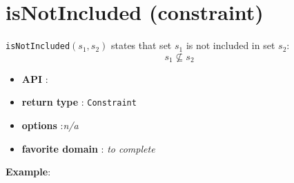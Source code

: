 \label{isnotincluded}
\hypertarget{isnotincluded}{}

\section{isNotIncluded (constraint)}\label{isnotincluded:isnotincludedconstraint}\hypertarget{isnotincluded:isnotincludedconstraint}{}
\begin{notedef}
  \texttt{isNotIncluded}$(s_1,s_2)$ states that set $s_1$ is not included in set $s_2$:
 $$s_1\not\subseteq s_2$$
\end{notedef}

\begin{itemize}
	\item \textbf{API} : 
	\item \textbf{return type} : \texttt{Constraint}
	\item \textbf{options} :\emph{n/a}
	\item \textbf{favorite domain} : \emph{to complete}
\end{itemize}

\textbf{Example}:
 

